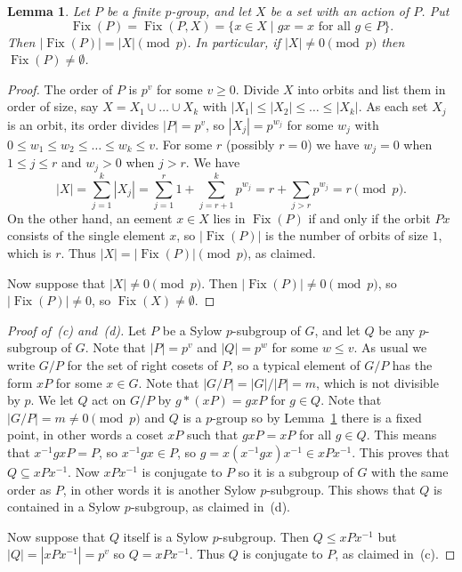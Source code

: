 \documentclass{amsart}
\DeclareMathOperator{\Fix}      {Fix}
\newcommand{\st}        {\;|\;}
\newcommand{\sse}       {\subseteq}
\renewcommand{\:}{\colon}
\newtheorem{lemma}[theorem]{Lemma}
\theoremstyle{definition}
\begin{document}
\begin{lemma}\label{lem-p-fixed}
 Let $P$ be a finite $p$-group, and let $X$ be a set with an action of
 $P$.  Put
 \[ \Fix(P)=\Fix(P,X)=\{x\in X\st gx=x \text{ for all } g\in P\}. \]
 Then $|\Fix(P)|=|X|\pmod{p}$.  In particular, if $|X|\neq 0\pmod{p}$
 then $\Fix(P)\neq\emptyset$.
\end{lemma}
\begin{proof}
 The order of $P$ is $p^v$ for some $v\geq 0$.  Divide $X$ into orbits
 and list them in order of size, say $X=X_1\cup\ldots\cup X_k$ with
 $|X_1|\leq|X_2|\leq\ldots\leq|X_k|$.  As each set $X_j$ is an orbit,
 its order divides $|P|=p^v$, so $|X_j|=p^{w_j}$ for some $w_j$ with
 $0\leq w_1\leq w_2\leq\ldots\leq w_k\leq v$.  For some $r$ (possibly
 $r=0$) we have $w_j=0$ when $1\leq j\leq r$ and $w_j>0$ when $j>r$.
 We have
 \[ |X| = \sum_{j=1}^k |X_j| = \sum_{j=1}^r 1 + \sum_{j=r+1}^k p^{w_j}
        = r + \sum_{j>r} p^{w_j} = r \pmod{p}.
 \]
 On the other hand, an eement $x\in X$ lies in $\Fix(P)$ if and only
 if the orbit $Px$ consists of the single element $x$, so $|\Fix(P)|$
 is the number of orbits of size $1$, which is $r$.  Thus
 $|X|=|\Fix(P)|\pmod{p}$, as claimed.

 Now suppose that $|X|\neq 0\pmod{p}$.  Then
 $|\Fix(P)|\neq 0\pmod{p}$, so $|\Fix(P)|\neq 0$, so
 $\Fix(X)\neq\emptyset$.
\end{proof}

\begin{proof}[Proof of~(c) and~(d)]
 Let $P$ be a Sylow $p$-subgroup of $G$, and let $Q$ be any
 $p$-subgroup of $G$.  Note that $|P|=p^v$ and $|Q|=p^w$ for some
 $w\leq v$.  As usual we write $G/P$ for the set of right cosets of
 $P$, so a typical element of $G/P$ has the form $xP$ for some
 $x\in G$.  Note that $|G/P|=|G|/|P|=m$, which is not divisible by
 $p$.  We let $Q$ act on $G/P$ by $g*(xP)=gxP$ for $g\in Q$.  Note
 that $|G/P|=m\neq 0\pmod{p}$ and $Q$ is a $p$-group so by
 Lemma~\ref{lem-p-fixed} there is a fixed point, in other words a
 coset $xP$ such that $gxP=xP$ for all $g\in Q$.  This means that
 $x^{-1}gxP=P$, so $x^{-1}gx\in P$, so
 $g=x(x^{-1}gx)x^{-1}\in xPx^{-1}$.  This proves that
 $Q\sse xPx^{-1}$.  Now $xPx^{-1}$ is conjugate to $P$ so it is a
 subgroup of $G$ with the same order as $P$, in other words it is
 another Sylow $p$-subgroup.  This shows that $Q$ is contained in a
 Sylow $p$-subgroup, as claimed in~(d).

 Now suppose that $Q$ itself is a Sylow $p$-subgroup.  Then
 $Q\leq xPx^{-1}$ but $|Q|=|xPx^{-1}|=p^v$ so $Q=xPx^{-1}$.  Thus $Q$
 is conjugate to $P$, as claimed in~(c).
\end{proof}
\end{document}
